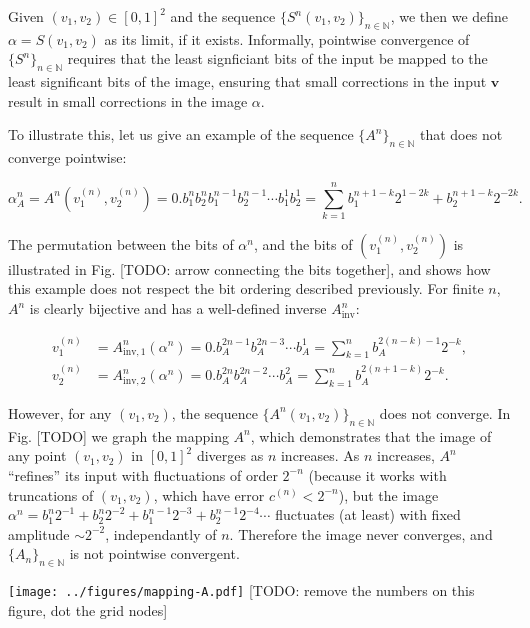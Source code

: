 \documentclass[10pt,letterpaper]{article}
\renewcommand{\vec}[1]{\boldsymbol{#1}}
\begin{document}
Given $(v_1, v_2) \in [0,1]^2$ and the sequence $\{S^n(v_1, v_2)\}_{n \in \mathbb N}$, we then we define $\alpha = S(v_1, v_2)$ as its limit, if it exists. Informally, pointwise convergence of $\{S^n\}_{n\in\mathbb N}$ requires that the least signficiant bits of the input be mapped to the least significant bits of the image, ensuring that small corrections in the input $\vec{v}$ result in small corrections in the image $\alpha$.

To illustrate this, let us give an example of the sequence $\{A^n\}_{n \in \mathbb N}$ that does not converge pointwise:

\begin{equation*}
\alpha_A^n = A^n(v_1^{(n)},v_2^{(n)}) = 0.b_1^n b_2^n b_1^{n-1} b_2^{n-1} \cdots b_1^1 b_2^1 = \sum_{k=1}^n b_1^{n+1-k} 2^{1-2k} + b_2^{n+1-k} 2^{-2k}.
\end{equation*}

The permutation between the bits of $\alpha^n$, and the bits of $(v_1^{(n)}, v_2^{(n)})$ is illustrated in Fig. [TODO: arrow connecting the bits together], and shows how this example does not respect the bit ordering described previously.
For finite $n$, $A^n$ is clearly bijective and has a well-defined inverse $A^n_\textrm{inv}$:

\begin{equation*} \begin{aligned}
v_1^{(n)} &= A^n_{\textrm{inv},1}(\alpha^n) = 0.b_A^{2n-1} b_A^{2n-3} \cdots b_A^1 = \sum_{k=1}^n b_A^{2(n-k)-1} 2^{-k}, \\
v_2^{(n)} &= A^n_{\textrm{inv},2}(\alpha^n) = 0.b_A^{2n} b_A^{2n-2} \cdots b_A^2 = \sum_{k=1}^n b_A^{2(n+1-k)} 2^{-k}.
\end{aligned} \end{equation*}

However, for any $(v_1,v_2)$, the sequence $\{A^n(v_1, v_2)\}_{n \in \mathbb N}$ does not converge. In Fig. [TODO] we graph the mapping $A^n$, which demonstrates that the image of any point $(v_1,v_2)$ in $[0,1]^2$ diverges as $n$ increases. As $n$ increases, $A^n$ ``refines'' its input with fluctuations of order $2^{-n}$ (because it works with truncations of $(v_1, v_2)$, which have error $c^{(n)} < 2^{-n}$), but the image $\alpha^n=b_1^n 2^{-1} + b_2^n 2^{-2} + b_1^{n-1} 2^{-3} + b_2^{n-1} 2^{-4} \cdots$ fluctuates (at least) with fixed amplitude $\sim 2^{-2}$, independantly of $n$. Therefore the image never converges, and $\{A_n\}_{n \in \mathbb N}$ is not pointwise convergent.

\texttt{[image: ../figures/mapping-A.pdf]}
[TODO: remove the numbers on this figure, dot the grid nodes]
\endif
\end{document}
